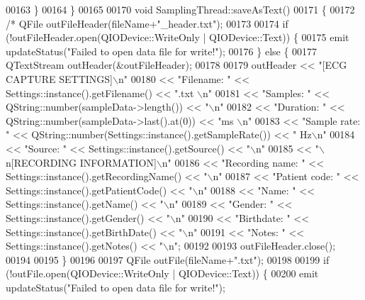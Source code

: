 \begin{DoxyCode}
00163     \}
00164 \}
00165 
00170 \textcolor{keywordtype}{void} SamplingThread::saveAsText()
00171 \{
00172     \textcolor{comment}{/*    QFile outFileHeader(fileName+"\_header.txt");}
00173 \textcolor{comment}{}
00174 \textcolor{comment}{    if (!outFileHeader.open(QIODevice::WriteOnly | QIODevice::Text)) \{}
00175 \textcolor{comment}{        emit updateStatus("Failed to open data file for write!");}
00176 \textcolor{comment}{    \} else \{}
00177 \textcolor{comment}{        QTextStream outHeader(&outFileHeader);}
00178 \textcolor{comment}{}
00179 \textcolor{comment}{        outHeader   << "[ECG CAPTURE SETTINGS]\(\backslash\)n"}
00180 \textcolor{comment}{                    << "Filename: " <<      Settings::instance().getFilename() << ".txt \(\backslash\)n"}
00181 \textcolor{comment}{                    << "Samples: " <<       QString::number(sampleData->length()) << "\(\backslash\)n"}
00182 \textcolor{comment}{                    << "Duration: " <<      QString::number(sampleData->last().at(0)) << "ms \(\backslash\)n"}
00183 \textcolor{comment}{                    << "Sample rate: " <<   QString::number(Settings::instance().getSampleRate()) << "
       Hz\(\backslash\)n"}
00184 \textcolor{comment}{                    << "Source: "  <<       Settings::instance().getSource() << "\(\backslash\)n"}
00185 \textcolor{comment}{                    << "\(\backslash\)n[RECORDING INFORMATION]\(\backslash\)n"}
00186 \textcolor{comment}{                    << "Recording name: " <<    Settings::instance().getRecordingName() << "\(\backslash\)n"}
00187 \textcolor{comment}{                    << "Patient code: " <<      Settings::instance().getPatientCode() << "\(\backslash\)n"}
00188 \textcolor{comment}{                    << "Name: " <<              Settings::instance().getName() << "\(\backslash\)n"}
00189 \textcolor{comment}{                    << "Gender: " <<            Settings::instance().getGender() << "\(\backslash\)n"}
00190 \textcolor{comment}{                    << "Birthdate: " <<         Settings::instance().getBirthDate() << "\(\backslash\)n"}
00191 \textcolor{comment}{                    << "Notes: " <<             Settings::instance().getNotes() << "\(\backslash\)n";}
00192 \textcolor{comment}{}
00193 \textcolor{comment}{        outFileHeader.close();}
00194 \textcolor{comment}{}
00195 \textcolor{comment}{    \}}
00196 \textcolor{comment}{}
00197 \textcolor{comment}{    QFile outFile(fileName+".txt");}
00198 \textcolor{comment}{}
00199 \textcolor{comment}{    if (!outFile.open(QIODevice::WriteOnly | QIODevice::Text)) \{}
00200 \textcolor{comment}{        emit updateStatus("Failed to open data file for write!");}

\end{DoxyCode}
